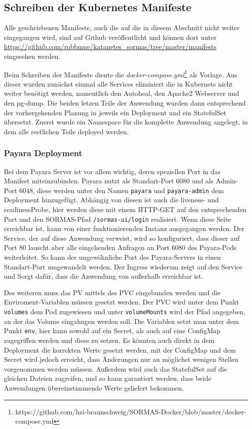 \subsection{Schreiben der Kubernetes Manifeste}

Alle geschriebenen Manifeste, auch die auf die in diesem Abschnitt nicht weiter eingegangen wird, sind auf Github veröffentlicht und können dort unter \url{https://github.com/robbmue/katanetes_sormas/tree/master/manifests} eingesehen werden. 

Beim Schreiben der Manifeste diente die \textit{docker-compose.yml}\footnote{https://github.com/hzi-braunschweig/SORMAS-Docker/blob/master/docker-compose.yml} als Vorlage.
Aus dieser wurden zunächst einmal alle Services eliminiert die in Kubernets nicht weiter benötigt werden, namentlich den Autoheal, den Apache2 Webserver und den pg-dump.
Die beiden letzen Teile der Anwendung wurden dann entsprechend der vorhergehenden Planung in jeweils ein Deployment und ein StatefulSet übersetzt.
Zuerst wurde ein Namespace für die komplette Anwendung angelegt, in dem alle restlichen Teile deployed werden.

\hfill \newline
\subsubsection{Payara Deployment}
Bei dem Payara Server ist vor allem wichtig, deren speziellen Port in das Manifest miteinzubinden.
Payara nutzt als Standart-Port 6080 und als Admin-Port 6048, diese werden unter den Namen \texttt{payara} und \texttt{payara-admin} dem Deployment hinzugefügt.
Abhängig von diesen ist auch die liveness- und readinessProbe, hier werden diese mit einem \ac{HTTP}-GET auf den entsprechenden Port und den \ac{SORMAS}-Pfad \texttt{/sormas-ui/login} realisiert.
Wenn diese Seite erreichbar ist, kann von einer funktionierenden Instanz ausgegangen werden.
Der Service, der auf diese Anwendung verweist, wird so konfiguriert, dass dieser auf Port 80 lauscht aber alle eingehenden Anfragen an Port 6080 des Payara-Pods weiterleitet.
So kann der ungewöhnliche Port des Payara-Servers in einen Standart-Port umgewandelt werden. 
Der Ingress wiederum zeigt auf den Service und Sorgt dafür, dass die Anwendung von außerhalb erreichbar ist.

Des weiteren muss das \ac{PV} mittels des \ac{PVC} eingebunden werden und die Enviroment-Variablen müssen gesetzt werden. 
Der \ac{PVC} wird unter dem Punkt \texttt{volumes} dem Pod zugewiesen und unter \texttt{volumeMounts} wird der Pfad angegeben, an der das Volume eingahngen werden soll. 
Die Variablen setzt man unter dem Punkt \texttt{env}, hier kann sowohl auf ein Secret, als auch auf eine ConfigMap zugegriffen werden und diese zu setzen.
Es könnten auch direkt in dem Deployment die korrekten Werte gesetzt werden, mit der ConfigMap und dem Secret wird jedoch erreicht, dass Änderungen nur an möglichst wenigen Stellen vorgenommen werden müssen.
Außerdem wird auch das StatefulSet auf die gleichen Dateien zugreifen, und so kann garantiert werden, dass beide Anwendungen übereinstimmende Werte geliefert bekommen.

